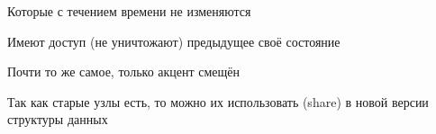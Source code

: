 \begin{frame}%
\begin{definition}
  Которые с течением времени не изменяются \faSmileO
\end{definition}

\vspace{1em}

\begin{definition}
Имеют доступ (не уничтожают) предыдущее своё состояние
\end{definition}
Почти то же самое, только акцент смещён\vspace{1em}

\begin{remark}
Так как старые узлы есть, то можно их использовать (share) в новой версии структуры данных
\end{remark}
\begin{definition}
\end{definition}
\end{frame}

